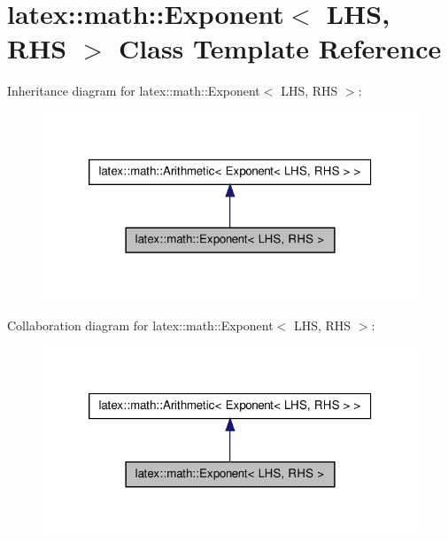 \hypertarget{classlatex_1_1math_1_1Exponent}{\section{latex\-:\-:math\-:\-:\-Exponent$<$ \-L\-H\-S, \-R\-H\-S $>$ \-Class \-Template \-Reference}
\label{classlatex_1_1math_1_1Exponent}
}


\-Inheritance diagram for latex\-:\-:math\-:\-:\-Exponent$<$ \-L\-H\-S, \-R\-H\-S $>$\-:
\nopagebreak
\begin{figure}[H]
\begin{center}
\leavevmode
\includegraphics[width=320pt]{classlatex_1_1math_1_1Exponent__inherit__graph}
\end{center}
\end{figure}


\-Collaboration diagram for latex\-:\-:math\-:\-:\-Exponent$<$ \-L\-H\-S, \-R\-H\-S $>$\-:
\nopagebreak
\begin{figure}[H]
\begin{center}
\leavevmode
\includegraphics[width=320pt]{classlatex_1_1math_1_1Exponent__coll__graph}
\end{center}
\end{figure}
